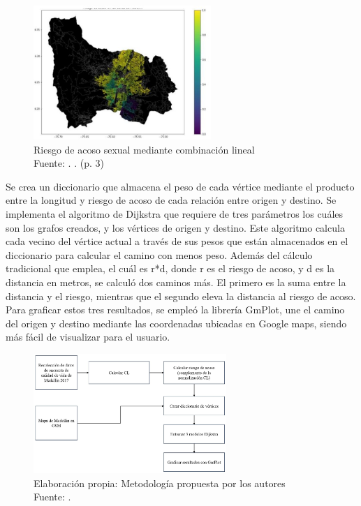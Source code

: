 \begin{figure}[h]
	\begin{center}
		\includegraphics[width=0.6\textwidth]{2/figures/segmento.jpg}
		\caption{Riesgo de acoso sexual mediante combinación lineal \\
			Fuente: \citep*{pr_areiza}. . (p. 3)}
		\label{1:fig2}
	\end{center}
\end{figure}
Se crea un diccionario que almacena el peso de cada vértice mediante el producto entre la longitud y riesgo de acoso de cada relación entre origen y destino. Se implementa el algoritmo de Dijkstra que requiere de tres parámetros los cuáles son los grafos creados, y los vértices de origen y destino. Este algoritmo calcula cada vecino del vértice actual a través de sus pesos que están almacenados en el diccionario para calcular el camino con menos peso. Además del cálculo tradicional que emplea, el cuál es r*d, donde r es el riesgo de acoso, y d es la distancia en metros, se calculó dos caminos más. El primero es la suma entre la distancia y el riesgo, mientras que el segundo eleva la distancia al riesgo de acoso. Para graficar estos tres resultados, se empleó la librería GmPlot, une el camino del origen y destino mediante las coordenadas ubicadas en Google maps, siendo más fácil de visualizar para el usuario.
\begin{figure}[h]
	\begin{center}
		\includegraphics[width=0.65\textwidth]{2/figures/medellinMetodo.jpg}
		\caption{Elaboración propia: Metodología propuesta por los autores  \\
			Fuente: \citep*{pr_areiza}. }
		\label{1:fig2}
	\end{center}
\end{figure}
